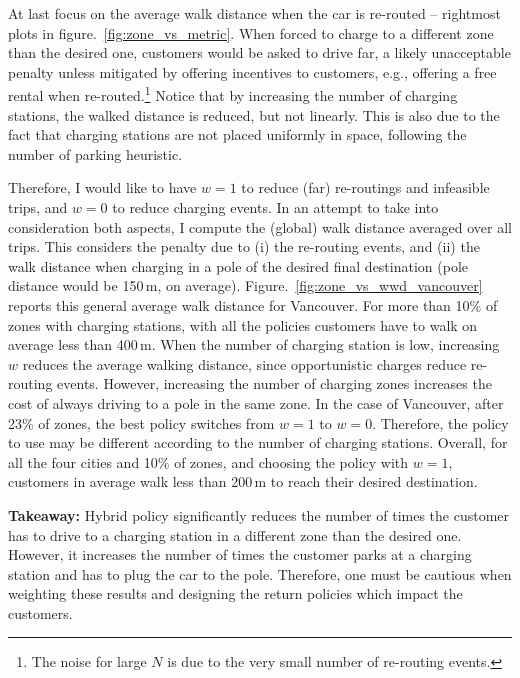 At last focus on the average walk distance when the car is re-routed -- rightmost plots in figure.~\ref{fig:zone_vs_metric}. When forced to charge to a different zone than the desired one, customers would be asked to drive far, a likely unacceptable penalty unless mitigated by offering incentives to customers, e.g., offering a free rental when re-routed.\footnote{The noise for large $N$ is due to the very small number of re-routing events.} Notice that by increasing the number of charging stations, the walked distance is reduced, but not linearly. This is also due to the fact that charging stations are not placed uniformly in space, following the number of parking heuristic. 



Therefore, I would like to have $w=1$ to reduce (far) re-routings and infeasible trips, and $w=0$ to reduce charging events. In an attempt to take into consideration both aspects, I compute the (global) walk distance averaged over all trips. This considers the penalty due to (i) the re-routing events, and (ii) the walk distance when charging in a pole of the desired final destination (pole distance would be 150\,m, on average).
Figure.~\ref{fig:zone_vs_wwd_vancouver} reports this general average walk distance for Vancouver. For more than 10\% of zones with charging stations, with all the policies customers have to walk on average less than 400\,m.
When the number of charging station is low, increasing $w$ reduces the average walking distance, since opportunistic charges reduce re-routing events. However, increasing the number of charging zones increases the cost of always driving to a pole in the same zone. In the case of Vancouver, after 23\% of zones, the best policy switches from $w=1$ to $w=0$. Therefore, the policy to use may be different according to the number of charging stations. Overall, for all the four cities and 10\% of zones, and choosing the policy with $w=1$, customers in average walk less than 200\,m to reach their desired destination.

\textbf{Takeaway:} Hybrid policy significantly reduces the number of times the customer has to drive to a charging station in a different zone than the desired one. However, it increases the number of times the customer parks at a charging station and has to plug the car to the pole. Therefore, one must  be cautious when weighting these results and designing the return policies which impact the customers. 


